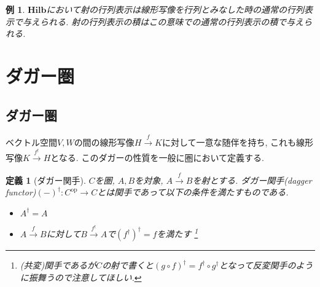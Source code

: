 \documentclass[a4paper,12pt]{ltjsarticle}
\theoremstyle{break}
\newtheorem{defn}[thm]{定義}
\newtheorem{thrm}[thm]{定理}
\newtheorem{eg}[thm]{例}
\newtheorem*{prf}{証明}
\newcommand{\hilb}{\mathbf{Hilb}}
\newcommand{\Hom}{\mathrm{Hom}}
\newcommand{\Op}{\mathrm{op}}
\newcommand{\xr}[1]{\xrightarrow{#1}}
\newcommand{\ci}{\circ}
\newcommand{\da}{\dagger}
\newcommand{\opl}{\oplus}
\numberwithin{equation}{section}
\begin{document}
\begin{eg}
  $\hilb$において射の行列表示は線形写像を行列とみなした時の通常の行列表示で与えられる. 
  射の行列表示の積はこの意味での通常の行列表示の積で与えられる. 
\end{eg}




\newpage

\section{ダガー圏}

\subsection{ダガー圏}

ベクトル空間$V,W$の間の線形写像$H \xr{f} K$に対して一意な随伴を持ち, これも線形写像$K \xr{f^\da} H$となる. 
このダガーの性質を一般に圏において定義する. 

\begin{defn}[ダガー関手]
  $C$を圏, $A,B$を対象, $A \xr{f} B$を射とする.  
  ダガー関手(dagger functor)$(-)^\da: C^{\Op} \to C$とは関手であって以下の条件を満たすものである. 
  \begin{itemize}
    \item $A^\da = A$
    \item $A \xr{f} B$に対して$B \xr{f^\da} A$で$(f^\da)^\da = f$を満たす
    \footnote{
      (共変)関手であるが$C$の射で書くと$(g \ci f)^\da = f^\da \ci g^\da$となって反変関手のように振舞うので注意してほしい. 
    }
  \end{itemize}
\end{defn}
\end{document}
